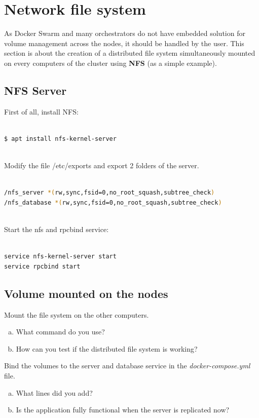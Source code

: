 \documentclass[a4paper,11pt]{exam}
\begin{document}
\clearpage

\section{Network file system}

As Docker Swarm and many orchestrators do not have embedded solution for volume management across the nodes, it should be handled by the user.
This section is about the creation of a distributed file system simultaneously mounted on every computers of the cluster using \textbf{NFS} (as a simple example).

\subsection{NFS Server}

First of all, install NFS:

\begin{lstlisting}[frame=single,language={sh}]  % Start your code-block

$ apt install nfs-kernel-server
			
\end{lstlisting}

Modify the file /etc/exports and export 2 folders of the server.

\begin{lstlisting}[frame=single,language={sh}]  % Start your code-block

/nfs_server *(rw,sync,fsid=0,no_root_squash,subtree_check)
/nfs_database *(rw,sync,fsid=0,no_root_squash,subtree_check)	
			
\end{lstlisting}

Start the nfs and rpcbind service: 

\begin{lstlisting}[frame=single,language={sh}]  % Start your code-block

service nfs-kernel-server start	
service rpcbind start			

\end{lstlisting}

\subsection{Volume mounted on the nodes}

\begin{questions}
	\question Mount the file system on the other computers.
	\begin{enumerate}[(a)]
		\item What command do you use?
		\item How can you test if the distributed file system is working?
	\end{enumerate}
	\question Bind the volumes to the server and database service in the \textit{docker-compose.yml} file.
	\begin{enumerate}[(a)]
		\item What lines did you add?
		\item Is the application fully functional when the server is replicated now?
	\end{enumerate}
\end{questions}
\end{document}
